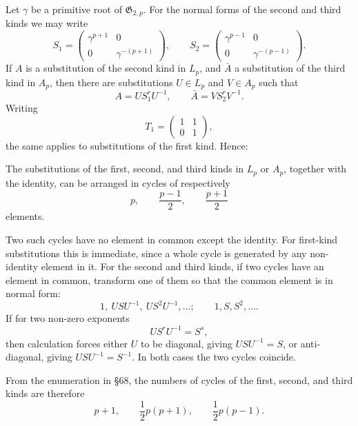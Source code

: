 \documentclass[11pt,a4paper]{article}
\begin{document}
Let \(\gamma\) be a primitive root of \(\mathfrak G_{2,p}\).  For the normal forms of the second and third kinds we may write
\begin{equation}\label{eq:69-normal}
 S_1=\begin{pmatrix}\gamma^{p+1}&0\\0&\gamma^{-(p+1)}\end{pmatrix},
 \qquad
 S_2=\begin{pmatrix}\gamma^{p-1}&0\\0&\gamma^{-(p-1)}\end{pmatrix}.
\end{equation}
If \(A\) is a substitution of the second kind in \(L_p\), and \(\bar A\) a substitution of the third kind in \(A_p\), then there are substitutions \(U\in L_p\) and \(V\in A_p\) such that
\[
 A=US_1^rU^{-1},
 \qquad
 \bar A=VS_2^rV^{-1}.
\]
Writing
\[
 T_1=\begin{pmatrix}1&1\\0&1\end{pmatrix},
\]
the same applies to substitutions of the first kind.  Hence:

The substitutions of the first, second, and third kinds in \(L_p\) or \(A_p\), together with the identity, can be arranged in cycles of respectively
\[
 p,
 \qquad \frac{p-1}{2},
 \qquad \frac{p+1}{2}
\]
elements.

Two such cycles have no element in common except the identity.  For first-kind substitutions this is immediate, since a whole cycle is generated by any non-identity element in it.  For the second and third kinds, if two cycles have an element in common, transform one of them so that the common element is in normal form:
\begin{equation}\label{eq:69-12}
 1,\ USU^{-1},\ US^2U^{-1},\ldots;
 \qquad
 1,S,S^2,\ldots.
\end{equation}
If for two non-zero exponents
\[
 US^rU^{-1}=S^s,
\]
then calculation forces either \(U\) to be diagonal, giving \(USU^{-1}=S\), or anti-diagonal, giving \(USU^{-1}=S^{-1}\).  In both cases the two cycles coincide.

From the enumeration in \S 68, the numbers of cycles of the first, second, and third kinds are therefore
\begin{equation}\label{eq:69-cycle-counts}
 p+1,
 \qquad
 \frac12p(p+1),
 \qquad
 \frac12p(p-1).
\end{equation}
\end{document}
